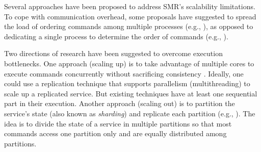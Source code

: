 Several approaches have been proposed to address SMR's scalability limitations.
To cope with communication overhead, some proposals have suggested to spread the
load of ordering commands among multiple processes (e.g.,
\cite{Moraru:2013gw,Mencius,Marandi:2012hb}), as opposed to dedicating a single
process to determine the order of commands (e.g.,
\cite{Lam98}).%

Two directions of research have been suggested to overcome execution
bottlenecks. One approach (scaling up) is to take advantage of multiple cores to
execute commands concurrently without sacrificing consistency
\cite{Kapritsos:2012um,Marandi:2014bj,Kotla:2004ep,Guo:2014jp}. Ideally, one
could use a replication technique that supports parallelism (multithreading) to
scale up a replicated service. But existing techniques have at least one
sequential part in their execution. Another approach (scaling out) is to
partition the service's state (also known as \emph{sharding}) and replicate each
partition (e.g., \cite{Glendenning:2011kj,Marandi:2011dj}). The idea is to
divide the state of a service in multiple partitions so that most commands
access one partition only and are equally distributed among partitions.





